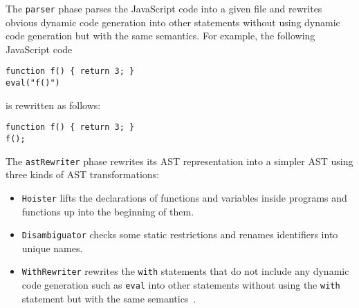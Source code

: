 \medskip
The \verb!parser! phase parses the JavaScript code into a given file and
rewrites obvious dynamic code generation into other statements without using
dynamic code generation but with the same semantics.  For example, the following
JavaScript code
\begin{verbatim}
function f() { return 3; }
eval("f()")
\end{verbatim}
is rewritten as follows:
\begin{verbatim}
function f() { return 3; }
f();
\end{verbatim}

\medskip
The \verb!astRewriter! phase rewrites its AST representation into a simpler AST
using three kinds of AST transformations:
\begin{itemize}
\item \verb!Hoister! lifts the declarations of functions and variables inside
programs and functions up into the beginning of them.
\item \verb!Disambiguator! checks some static restrictions and renames identifiers
into unique names.
\item \verb!WithRewriter! rewrites the \verb!with! statements that do not include
any dynamic code generation such as \verb!eval! into other statements without using
the \verb!with! statement but with the same semantics~\cite{dls13,withtr}.
\end{itemize}


